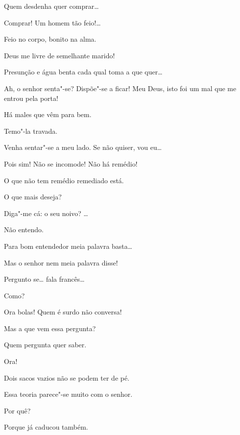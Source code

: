 \begin{linenumbers}
  Quem desdenha quer comprar\ldots{}

  Comprar! Um homem tão feio!\ldots{}

  Feio no corpo, bonito na alma.

   Deus me livre de semelhante marido!

  Presunção e água benta cada qual toma a que quer\ldots{}

   Ah, o senhor senta"-se? Dispõe"-se a ficar! Meu
Deus, isto foi um mal que me entrou pela porta!

   Há males que vêm para bem.

  Temo"-la travada.

  Venha sentar"-se a meu lado.  Se não quiser, vou eu\ldots{} 

  Pois sim! Não se incomode!  Não há
remédio!

   O que não tem remédio remediado
está.

  O que mais deseja?

  Diga"-me cá: o seu noivo? \ldots{} 

  Não entendo.

  Para bom entendedor meia palavra basta\ldots{}

  Mas o senhor nem meia palavra disse!

  Pergunto se\ldots{} fala francês\ldots{}

  Como?

  Ora bolas! Quem é surdo não conversa!

  Mas a que vem essa pergunta?

   Quem pergunta quer saber.

  Ora!

   Dois sacos vazios não se podem ter de pé.

  Essa teoria parece"-se muito com o senhor.

  Por quê?

  Porque já caducou também.


\end{linenumbers}
